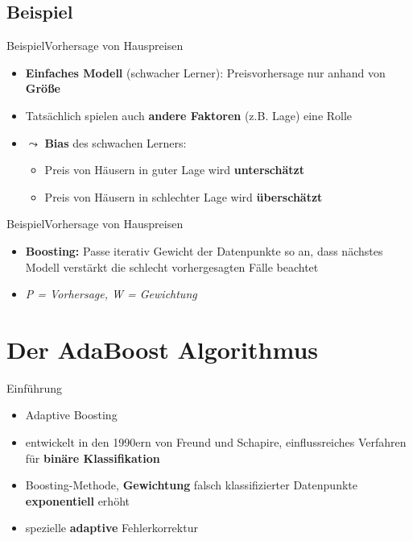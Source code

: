 \documentclass[hyperref={bookmarks=false},11pt,dvipsnames]{beamer}
\begin{document}
\subsection*{Beispiel}
\begin{frame}[t]{Beispiel}{Vorhersage von Hauspreisen}
	\begin{itemize}
		\item <1-> \textbf{Einfaches Modell} (schwacher Lerner): Preisvorhersage nur anhand von \textbf{Größe}
		\item <2-> Tatsächlich spielen auch \textbf{andere Faktoren} (z.B. Lage) eine Rolle
		\item <3-> $\leadsto$ \textbf{Bias} des schwachen Lerners:\\[5pt]
		      \begin{itemize}
			      \item Preis von Häusern in guter Lage wird \textbf{unterschätzt}
			      \item Preis von Häusern in schlechter Lage wird \textbf{überschätzt}
		      \end{itemize}
	\end{itemize}
\end{frame}

\begin{frame}[t]{Beispiel}{Vorhersage von Hauspreisen}
	\begin{itemize}
		\item \textbf{Boosting:} Passe iterativ Gewicht der Datenpunkte so an, dass nächstes Modell verstärkt die schlecht vorhergesagten Fälle beachtet
		\item [] \emph{P = Vorhersage, W = Gewichtung}
	\end{itemize}
	\begin{table}
		\centering
		\resizebox{0.95\textwidth}{!}{%
			
		}
		\resizebox{0.95\textwidth}{!}{%
			
		}
	\end{table}
\end{frame}

\section{Der AdaBoost Algorithmus}
\begin{frame}[t]{Einführung}
	\begin{itemize}
		\item <1-> \glqq Adaptive Boosting\grqq
		\item <2-> entwickelt in den 1990ern von Freund und Schapire, einflussreiches Verfahren für \textbf{binäre Klassifikation}
		\item <3-> Boosting-Methode, \textbf{Gewichtung} falsch klassifizierter Datenpunkte \textbf{exponentiell} erhöht
		\item <4-> spezielle \textbf{adaptive} Fehlerkorrektur
	\end{itemize}
\end{frame}
\end{document}
